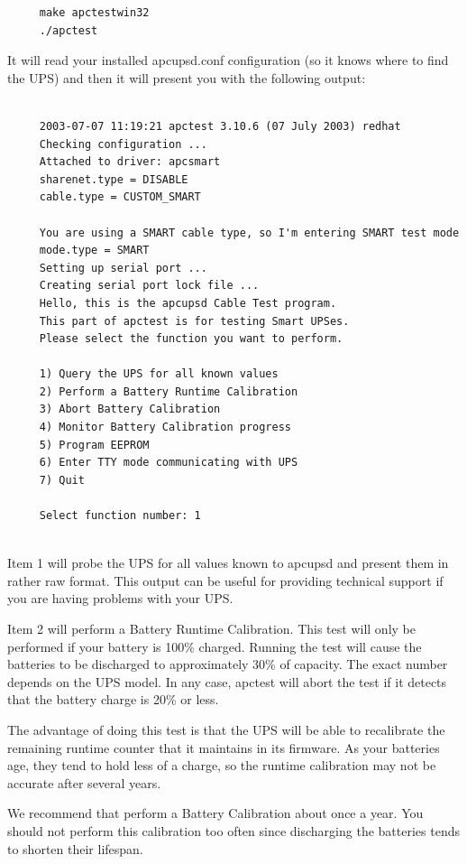 {{{{\begin{verbatim}
     make apctestwin32
     ./apctest
\end{verbatim}
\normalsize

It will read your installed apcupsd.conf configuration (so it knows where to
find the UPS) and then it will present you with the following output: 

\footnotesize
\begin{verbatim}
     
     2003-07-07 11:19:21 apctest 3.10.6 (07 July 2003) redhat
     Checking configuration ...
     Attached to driver: apcsmart
     sharenet.type = DISABLE
     cable.type = CUSTOM_SMART
     
     You are using a SMART cable type, so I'm entering SMART test mode
     mode.type = SMART
     Setting up serial port ...
     Creating serial port lock file ...
     Hello, this is the apcupsd Cable Test program.
     This part of apctest is for testing Smart UPSes.
     Please select the function you want to perform.
     
     1) Query the UPS for all known values
     2) Perform a Battery Runtime Calibration
     3) Abort Battery Calibration
     4) Monitor Battery Calibration progress
     5) Program EEPROM
     6) Enter TTY mode communicating with UPS
     7) Quit
     
     Select function number: 1
     
\end{verbatim}
\normalsize

Item 1 will probe the UPS for all values known to apcupsd and present them in
rather raw format. This output can be useful for providing technical support
if you are having problems with your UPS.  

Item 2 will perform a Battery Runtime Calibration. This test will only be
performed if your battery is 100\% charged. Running the test will cause the
batteries to be discharged to approximately 30\% of capacity. The exact number
depends on the UPS model. In any case, apctest will abort the test if it
detects that the battery charge is 20\% or less.  

The advantage of doing this test is that the UPS will be able to recalibrate
the remaining runtime counter that it maintains in its firmware. As your
batteries age, they tend to hold less of a charge, so the runtime calibration
may not be accurate after several years.  

We recommend that perform a Battery Calibration about once a year. You should
not perform this calibration too often since discharging the batteries tends
to shorten their lifespan.  

}}}}
